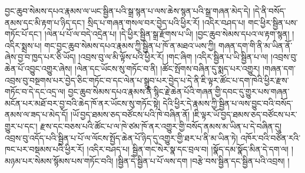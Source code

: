 བྱང་ཆུབ་སེམས་དཔའ་རྣམས་ལ་ཡང་སྦྱིན་པའི་སྒྲ་སྙན་པ་ལས་ཆེས་སྙན་པའི་སྒྲ་གཞན་མེད་དེ། །དེ་ནི་བསོད་ནམས་དང་མི་རྟག་པ་ཉིད་དང་། སྲིད་པ་གཞན་གསལ་བར་བྱེད་པའི་ཕྱིར་རོ། །འདིར་བཤད་པ། གང་ཕྱིར་སྦྱིན་པས་གཏོང་པོ་དང་། །ལེན་པ་པོ་ལ་བདེ་འདྲེན་པ། །དེ་ཕྱིར་སྦྱིན་སྒྲ་རྫོགས་པ་ཡི། །བྱང་ཆུབ་སེམས་དཔའ་ལ་རྟག་སྙན། །འདིར་སྨྲས་པ། གང་བྱང་ཆུབ་སེམས་དཔའ་རྣམས་ཀྱི་སྦྱིན་པ་ཁོ་ན་མཐའ་ཡས་ཀྱི། གཞན་དག་གི་ནི་མ་ཡིན་ནོ་ཞེས་བྱ་བ་ཁྱད་པར་ཅི་ཡོད། །འབྲས་བུ་ལ་མི་ལྟོས་པའི་ཕྱིར་རོ། །གང་ཞིག །འདིར་སྦྱིན་པ་ཡི་སྦྱིན་པ་ལ། །འབྲས་བུ་ཆེན་པོ་འབྱུང་འགྱུར་ཞེས། །ལེན་དང་ཡོངས་སུ་གཏོང་བ་ནི། །ཚོང་སྤོགས་བཞིན་དུ་སྨད་པར་འགྱུར། །གཞན་དག་འབྲས་བུ་བསྔགས་པར་བྱེད་ཅིང་གཏོང་བ་དང་ལེན་པ་སྒྲུབ་པར་བྱེད་པ་དེ་ནི་ཇི་ལྟར་ཚོང་པ་དག་ཁེའི་ཕྱིར་རྫས་གཏོང་བ་དེ་དང་འདྲ་ལ། བྱང་ཆུབ་སེམས་དཔའ་རྣམས་ནི་སྙིང་རྗེ་ཆེན་པོའི་གཞན་གྱི་དབང་དུ་གྱུར་པས་གཞན་མངོན་པར་མཐོ་བར་བྱ་བའི་ཆེད་ཁོ་ནར་ཡོངས་སུ་གཏོང་སྟེ། དེའི་ཕྱིར་དེ་རྣམས་ཀྱི་སྦྱིན་པ་ལས་བྱུང་བའི་བསོད་ནམས་ལ་ཟད་པ་མེད་དོ། །ཡོ་བྱད་ཐམས་ཅད་བཙོངས་པའི་ཁེ་བཞིན་ནོ། །ཇི་ལྟར་ཡོ་བྱད་ཐམས་ཅད་བཙོངས་པར་གྱུར་པ་དང་། རྫས་དང་བཅས་པའི་ཚོང་པ་ལ་ཁེ་ཙམ་ཁོ་ནར་འགྱུར་གྱི་བསོད་ནམས་མ་ཡིན་པ་དེ་བཞིན་དུ། འབྲས་བུ་འདོད་པའི་སྦྱིན་པ་པོ་ལ་ལོངས་སྤྱོད་ཆེན་པོ་ཉིད་དུ་འགྱུར་གྱི་ཐར་པ་ནི་མ་ཡིན་ཏེ། འཁོར་བའི་བཙོན་རའི་ཁང་པར་བསྡམས་པའི་ཕྱིར་རོ། །འདིར་བཤད་པ། སྦྱིན་གང་སེར་སྣ་དང་བྲལ་བ། །སྣོད་དམ་སྣོད་མིན་དེ་དག་ལ། །མཉམ་པར་སེམས་སྙོམས་པས་གཏོང་བའི། །སྦྱིན་དེ་སྦྱིན་པ་པོ་ལས་དག །བརྩེ་བས་སྦྱིན་དང་སྦྱིན་པའི་འབྲས། །
